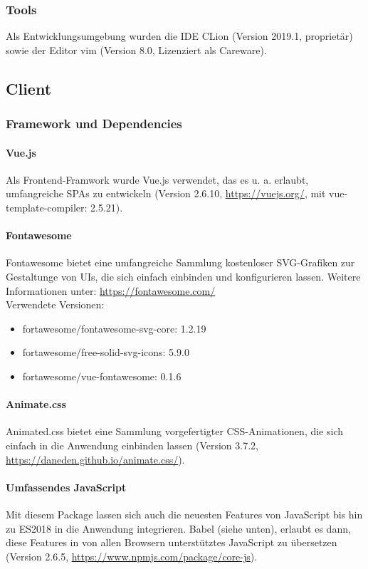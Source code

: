 \subsubsection{Tools}
Als Entwicklungsumgebung wurden die IDE CLion (Version 2019.1, proprietär) sowie der Editor vim (Version 8.0, Lizenziert als Careware).

\subsection{Client}

\subsubsection{Framework und Dependencies}
	\paragraph{Vue.js}
	Als Frontend-Framwork wurde Vue.js verwendet, das es u. a. erlaubt, umfangreiche SPAs zu entwickeln (Version 2.6.10, \url{https://vuejs.org/}, mit vue-template-compiler: 2.5.21).
	
	\paragraph{Fontawesome}
	Fontawesome bietet eine umfangreiche Sammlung kostenloser SVG-Grafiken zur Gestaltunge von UIs, die sich einfach einbinden und konfigurieren lassen. Weitere Informationen unter: \url{https://fontawesome.com/}\\
	Verwendete Versionen:
	\begin{itemize}
		\item fortawesome/fontawesome-svg-core: 1.2.19
		\item fortawesome/free-solid-svg-icons: 5.9.0
		\item fortawesome/vue-fontawesome: 0.1.6
	\end{itemize}

	\paragraph{Animate.css}
	Animated.css bietet eine Sammlung vorgefertigter CSS-Animationen, die sich einfach in die Anwendung einbinden lassen (Version 3.7.2, \url{https://daneden.github.io/animate.css/}).

	\paragraph{Umfassendes JavaScript}
	Mit diesem Package lassen sich auch die neuesten Features von JavaScript bis hin zu ES2018 in die Anwendung integrieren. Babel (siehe unten), erlaubt es dann, diese Features in von allen Browsern unterstütztes JavaScript zu übersetzen (Version 2.6.5, \url{https://www.npmjs.com/package/core-js}).


